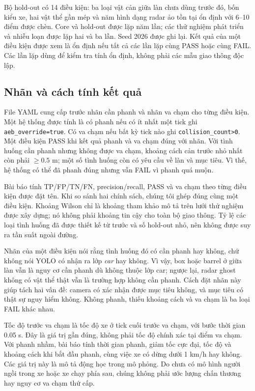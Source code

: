 \documentclass[conference]{IEEEtran}
\begin{document}
Bộ hold-out có 14 điều kiện: ba loại vật cản giữa làn chưa dùng trước đó,
bốn kiểu xe, hai vật thể gần mép và năm hình dạng radar ảo tồn tại ổn định
với 6--10 điểm được chèn. Core và hold-out được lặp năm lần; các thử nghiệm
phát triển và nhiễu loạn được lặp hai và ba lần. Seed 2026 được ghi lại.
Kết quả của một điều kiện được xem là ổn định nếu tất cả các lần lặp cùng PASS
hoặc cùng FAIL. Các lần lặp dùng để kiểm tra tính ổn định, không phải các mẫu
giao thông độc lập.

\subsection{Nhãn và cách tính kết quả}
File YAML cung cấp trước nhãn cần phanh và nhãn va chạm cho từng điều kiện.
Một hệ thống được tính là có phanh nếu có ít nhất một tick ghi
\texttt{aeb\_override=true}. Có va chạm nếu bất kỳ tick nào ghi
\texttt{collision\_count>0}. Một điều kiện PASS khi kết quả phanh và va chạm
đúng với nhãn. Với tình huống cần phanh nhưng không được va chạm, khoảng cách
cản trước nhỏ nhất còn phải $\geq0.5$ m; một số tình huống còn có yêu cầu về
làn và mục tiêu. Vì thế, hệ thống có thể đã phanh đúng nhưng vẫn FAIL vì phanh
quá muộn.

Bài báo tính TP/FP/TN/FN, precision/recall, PASS và va chạm theo từng điều
kiện được đặt tên. Khi so sánh hai chính sách, chúng tôi ghép đúng cùng một
điều kiện. Khoảng Wilson chỉ là khoảng tham khảo mô tả trên lưới thử nghiệm
được xây dựng; nó không phải khoảng tin cậy cho toàn bộ giao thông. Tỷ lệ các
loại tình huống đã được thiết kế từ trước và số hold-out nhỏ, nên không được
suy ra tần suất ngoài đường.

Nhãn của một điều kiện nói rằng tình huống đó có cần phanh hay không, chứ
không nói YOLO có nhận ra lớp \emph{car} hay không. Vì vậy, box hoặc barrel ở
giữa làn vẫn là nguy cơ cần phanh dù không thuộc lớp car; ngược lại, radar
ghost không có vật thể thật vẫn là trường hợp không cần phanh. Cách đặt nhãn
này giúp tách hai vấn đề: camera có xác nhận được mục tiêu không, và mục tiêu
có thật sự nguy hiểm không. Không phanh, thiếu khoảng cách và va chạm là ba
loại FAIL khác nhau.

Tốc độ trước va chạm là tốc độ xe ở tick cuối trước va chạm, với bước thời
gian 0.05 s. Đây là giá trị gần đúng, không phải tốc độ chính xác tại điểm
va chạm. Với phanh nhầm, bài báo tính thời gian phanh, giảm tốc cực đại,
tốc độ và khoảng cách khi bắt đầu phanh, cùng việc xe có dừng dưới 1 km/h
hay không. Các giá trị này là mô tả động học trong mô phỏng. Do chưa có mô
hình người ngồi trong xe hoặc xe chạy phía sau, chúng không phải ước lượng
chấn thương hay nguy cơ va chạm thứ cấp.
\end{document}
